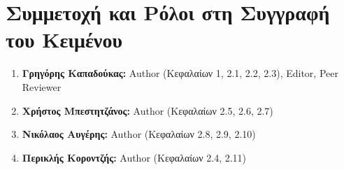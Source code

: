 \documentclass[12pt,a4paper]{article}
\begin{document}
\section{Συμμετοχή και Ρόλοι στη Συγγραφή του Κειμένου}
\begin{enumerate}
	\item \textbf{Γρηγόρης Καπαδούκας:} Author (Κεφαλαίων 1, 2.1, 2.2, 2.3), Editor, Peer Reviewer
	\item \textbf{Χρήστος Μπεστητζάνος:} Author (Κεφαλαίων 2.5, 2.6, 2.7)
   	\item \textbf{Νικόλαος Αυγέρης:} Author (Κεφαλαίων 2.8, 2.9, 2.10)
	\item \textbf{Περικλής Κοροντζής:} Author (Κεφαλαίων 2.4, 2.11)
\end{enumerate}
\end{document}
